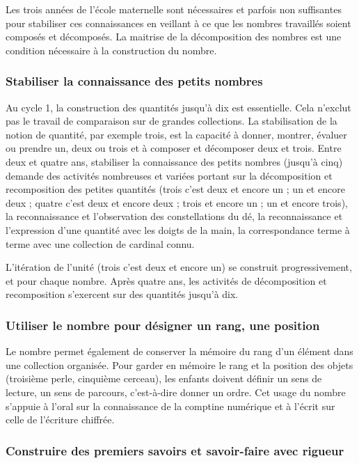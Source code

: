 Les trois années de l’école maternelle sont nécessaires et parfois non suffisantes pour stabiliser ces connaissances en veillant à ce que les nombres travaillés soient composés et décomposés. La maitrise de la décomposition des nombres est une condition nécessaire à la construction du nombre. 

\subsubsection{Stabiliser la connaissance des petits nombres}
Au cycle 1, la construction des quantités jusqu’à dix est essentielle. Cela n’exclut pas le travail de comparaison sur de grandes collections. La stabilisation de la notion de quantité, par exemple trois, est la capacité à donner, montrer, évaluer ou prendre un, deux ou trois et à composer et décomposer deux et trois. Entre deux et quatre ans, stabiliser la connaissance des petits nombres (jusqu’à cinq) demande des activités nombreuses et variées portant sur la décomposition et recomposition des petites quantités (trois c’est deux et encore un ; un et encore deux ; quatre c’est deux et encore deux ; trois et encore un ; un et encore trois), la reconnaissance et l’observation des constellations du dé, la reconnaissance et l’expression d’une quantité avec les doigts de la main, la correspondance terme à terme avec une collection de cardinal connu. 

L’itération de l’unité (trois c’est deux et encore un) se construit progressivement, et pour chaque nombre. Après quatre ans, les activités de décomposition et recomposition s’exercent sur des quantités jusqu’à dix. 

\subsubsection{Utiliser le nombre pour désigner un rang, une position}
Le nombre permet également de conserver la mémoire du rang d’un élément dans une collection organisée. Pour garder en mémoire le rang et la position des objets (troisième perle, cinquième cerceau), les enfants doivent définir un sens de lecture, un sens de parcours, c’est-à-dire donner un ordre. Cet usage du nombre s’appuie à l’oral sur la connaissance de la comptine numérique et à l’écrit sur celle de l’écriture chiffrée.

\subsubsection{Construire des premiers savoirs et savoir-faire avec rigueur}
